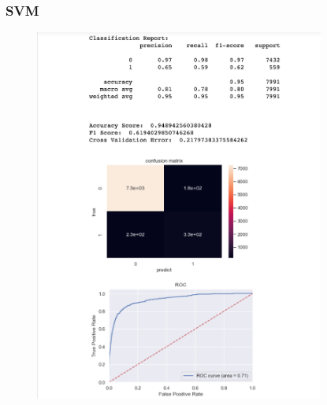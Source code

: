 \documentclass{article}
\begin{document}
\subsubsection{SVM}
\begin{figure}[H]
    \centering
    \includegraphics[width=0.85\textwidth]{Fig6}
\end{figure}
\end{document}
